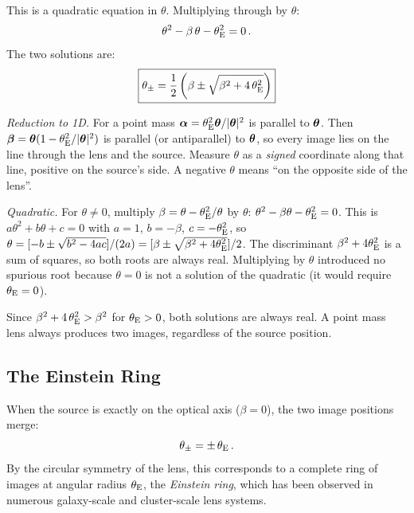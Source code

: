 This is a quadratic equation in $\theta$.  Multiplying through by
$\theta$:
\begin{equation}
    \theta^2 - \beta\,\theta - \theta_{\mathrm{E}}^2 = 0 \,.
    \label{eq:quadratic}
\end{equation}
The two solutions are:
\begin{equation}
    \boxed{
    \theta_\pm = \frac{1}{2}\left(\beta \pm
    \sqrt{\beta^2 + 4\,\theta_{\mathrm{E}}^2}\right)
    }
    \label{eq:image_positions}
\end{equation}
\begin{derivation}
\emph{Reduction to 1D.} For a point mass $\boldsymbol{\alpha} = \theta_{\mathrm{E}}^2\boldsymbol{\theta}/|\boldsymbol{\theta}|^2$
is parallel to $\boldsymbol{\theta}$. Then $\boldsymbol{\beta} = \boldsymbol{\theta}(1 - \theta_{\mathrm{E}}^2/|\boldsymbol{\theta}|^2)$
is parallel (or antiparallel) to $\boldsymbol{\theta}$, so every image lies on the
line through the lens and the source. Measure $\theta$ as a \emph{signed}
coordinate along that line, positive on the source's side. A negative
$\theta$ means ``on the opposite side of the lens''.

\emph{Quadratic.} For $\theta \neq 0$, multiply
$\beta = \theta - \theta_{\mathrm{E}}^2/\theta$ by $\theta$:
$\theta^2 - \beta\theta - \theta_{\mathrm{E}}^2 = 0$. This is $a\theta^2 + b\theta + c = 0$
with $a = 1$, $b = -\beta$, $c = -\theta_{\mathrm{E}}^2$, so
$\theta = [-b \pm \sqrt{b^2 - 4ac}]/(2a) = [\beta \pm \sqrt{\beta^2 + 4\theta_{\mathrm{E}}^2}]/2$.
The discriminant $\beta^2 + 4\theta_{\mathrm{E}}^2$ is a sum of squares, so both roots
are always real. Multiplying by $\theta$ introduced no spurious root because
$\theta = 0$ is not a solution of the quadratic (it would require $\theta_{\mathrm{E}} = 0$).
\end{derivation}

Since $\beta^2 + 4\,\theta_{\mathrm{E}}^2 > \beta^2$ for $\theta_{\mathrm{E}} > 0$, both
solutions are always real.  A point mass lens always produces
two images, regardless of the source position.

\subsection{The Einstein Ring}

When the source is exactly on the optical axis ($\beta = 0$), the two
image positions merge:
\begin{equation}
    \theta_\pm = \pm\,\theta_{\mathrm{E}} \,.
    \label{eq:einstein_ring_condition}
\end{equation}
By the circular symmetry of the lens, this corresponds to a complete
ring of images at angular radius $\theta_{\mathrm{E}}$, the
\emph{Einstein ring}, which has been observed in numerous galaxy-scale and
cluster-scale lens systems.

